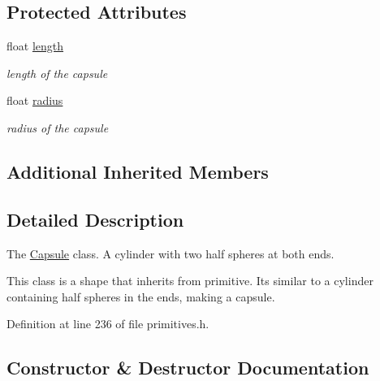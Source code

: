 \subsection*{Protected Attributes}
\begin{DoxyCompactItemize}
\item 
float \hyperlink{class_capsule_af62f20ecfc37b4c8ae88dd505ca1f196}{length}\hypertarget{class_capsule_af62f20ecfc37b4c8ae88dd505ca1f196}{}\label{class_capsule_af62f20ecfc37b4c8ae88dd505ca1f196}

\begin{DoxyCompactList}\small\item\em length of the capsule \end{DoxyCompactList}\item 
float \hyperlink{class_capsule_a9b7e591748a2b735b35d99a2d7792f39}{radius}\hypertarget{class_capsule_a9b7e591748a2b735b35d99a2d7792f39}{}\label{class_capsule_a9b7e591748a2b735b35d99a2d7792f39}

\begin{DoxyCompactList}\small\item\em radius of the capsule \end{DoxyCompactList}\end{DoxyCompactItemize}
\subsection*{Additional Inherited Members}


\subsection{Detailed Description}
The \hyperlink{class_capsule}{Capsule} class. A cylinder with two half spheres at both ends.

This class is a shape that inherits from primitive. It\textquotesingle{}s similar to a cylinder containing half spheres in the ends, making a capsule. 

Definition at line 236 of file primitives.\+h.



\subsection{Constructor \& Destructor Documentation}
